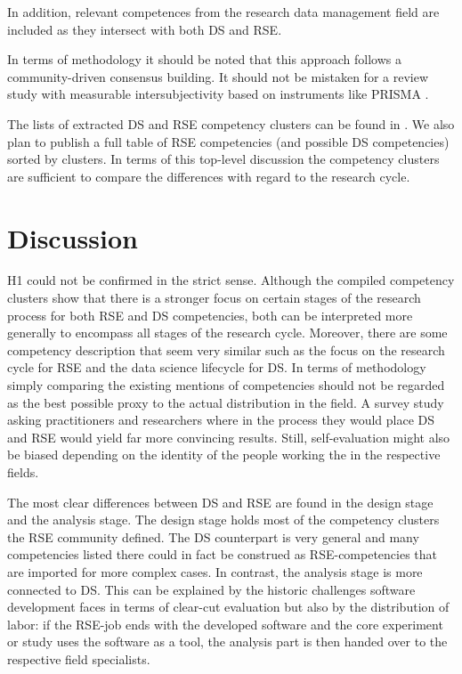 \documentclass[
        english,biblatex
    ]{lni}
\begin{document}
    In addition, relevant competences from the research data management
    field \autocite{petersen_2025_15025246} are included as they
    intersect with both DS and RSE.

    In terms of methodology it should be noted that this approach
    follows a community-driven consensus building. It should not be
    mistaken for a review study with measurable intersubjectivity based
    on instruments like PRISMA \autocite{Page2021PRISMA}.

    The lists of extracted DS and RSE competency clusters can be found
    in \autocite{ds2rse2025}. We also plan to publish a full table of
    RSE competencies (and possible DS competencies) sorted by clusters.
    In terms of this top-level discussion the competency clusters are
    sufficient to compare the differences with regard to the research
    cycle.

    \section{Discussion}\label{discussion}

    H1 could not be confirmed in the strict sense. Although the compiled
    competency clusters show that there is a stronger focus on certain
    stages of the research process for both RSE and DS competencies,
    both can be interpreted more generally to encompass all stages of
    the research cycle. Moreover, there are some competency description
    that seem very similar such as the focus on the research cycle for
    RSE and the data science lifecycle for DS. In terms of methodology
    simply comparing the existing mentions of competencies should not be
    regarded as the best possible proxy to the actual distribution in
    the field. A survey study asking practitioners and researchers where
    in the process they would place DS and RSE would yield far more
    convincing results. Still, self-evaluation might also be biased
    depending on the identity of the people working the in the
    respective fields.

    The most clear differences between DS and RSE are found in the
    design stage and the analysis stage. The design stage holds most of
    the competency clusters the RSE community defined. The DS
    counterpart is very general and many competencies listed there could
    in fact be construed as RSE-competencies that are imported for more
    complex cases. In contrast, the analysis stage is more connected to
    DS. This can be explained by the historic challenges software
    development faces in terms of clear-cut evaluation but also by the
    distribution of labor: if the RSE-job ends with the developed
    software and the core experiment or study uses the software as a
    tool, the analysis part is then handed over to the respective field
    specialists.
\end{document}
